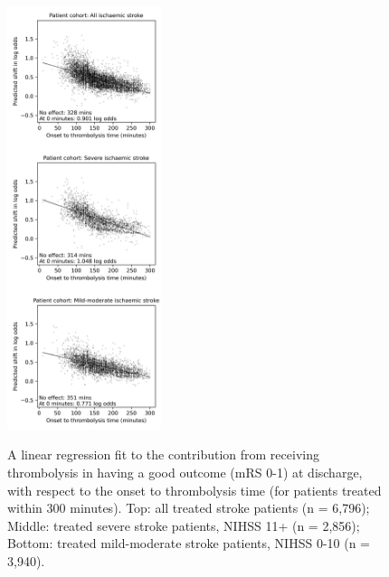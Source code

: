 \begin{figure}[h]
    \centering
    \includegraphics[width=0.40\textwidth]{./images/p3_regression_v1}\\
    \caption{A linear regression fit to the contribution from receiving thrombolysis in having a good outcome (mRS 0-1) at discharge, with respect to the onset to thrombolysis time (for patients treated within 300 minutes). Top: all treated stroke patients (n = 6,796); Middle: treated severe stroke patients, NIHSS 11+ (n = 2,856); Bottom: treated mild-moderate stroke patients, NIHSS 0-10 (n = 3,940).}
    \label{fig:linear_regression_plots}
\end{figure}

